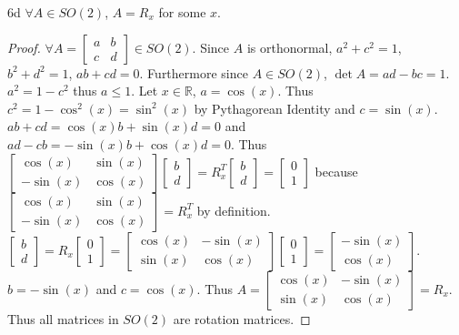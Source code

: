 \documentclass{article}
\newcommand{\R}{\mathbb{R}}
\begin{document}
\begin{claim}{6d}
    $\forall A \in SO(2)$, $A = R_x$ for some $x$.
\end{claim}
\begin{proof}
    $\forall A = \begin{bmatrix}
        a & b \\ c & d 
    \end{bmatrix} \in SO(2)$. Since $A$ is orthonormal, $a^2 + c^2 = 1$, $b^2 + d^2 = 1$, $ab + cd = 0$. Furthermore since $A \in SO(2)$, $\det A = ad - bc = 1$. $a^2 = 1 - c^2$ thus $a \leq 1$. Let $x \in \R$, $a = \cos(x)$. Thus $c^2 = 1 - \cos^2(x) = \sin^2(x)$ by Pythagorean Identity and $c = \sin(x)$. $ab + cd = \cos(x)b + \sin(x)d = 0$ and $ad - cb = -\sin(x)b + \cos(x)d = 0$. Thus $\begin{bmatrix}
        \cos(x) & \sin(x) \\ -\sin(x) & \cos(x)
    \end{bmatrix}\begin{bmatrix}
        b \\ d
    \end{bmatrix} = R_x^T\begin{bmatrix}
        b \\ d
    \end{bmatrix} = \begin{bmatrix}
        0 \\ 1
    \end{bmatrix}$ because $\begin{bmatrix}
        \cos(x) & \sin(x) \\ -\sin(x) & \cos(x)
    \end{bmatrix} = R_x^T$ by definition. $\begin{bmatrix}
        b \\ d
    \end{bmatrix} = R_x \begin{bmatrix}
        0 \\ 1
    \end{bmatrix} = \begin{bmatrix}
        \cos(x) & -\sin(x) \\ \sin(x) & \cos(x)
    \end{bmatrix} \begin{bmatrix}
        0 \\ 1
    \end{bmatrix} = \begin{bmatrix}
        -\sin(x) \\ \cos(x)
    \end{bmatrix}$. $b = -\sin(x)$  and $c = \cos(x)$. Thus $A = \begin{bmatrix}
        \cos(x) & -\sin(x) \\ \sin(x) & \cos(x)
    \end{bmatrix} = R_x$. Thus all matrices in $SO(2)$ are rotation matrices.
\end{proof}
\end{document}
